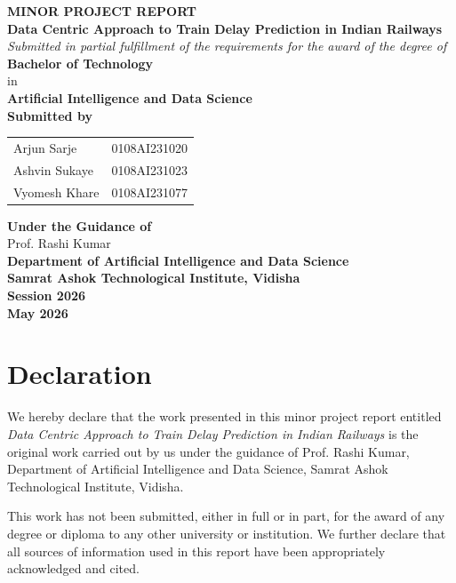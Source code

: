 \documentclass[12pt,a4paper]{report}
\newcommand{\projecttitle}{Data Centric Approach to Train Delay Prediction in Indian Railways}
\newcommand{\deptname}{Department of Artificial Intelligence and Data Science}
\newcommand{\institutename}{Samrat Ashok Technological Institute, Vidisha}
\newcommand{\sessionname}{Session 2026}
\newcommand{\submissionmonth}{May 2026}
\begin{document}
\begin{titlepage}
\centering
\vspace*{1.5cm}
{\Large \textbf{MINOR PROJECT REPORT}}\\[1.2cm]
{\LARGE \textbf{\projecttitle}}\\[1.5cm]

\textit{Submitted in partial fulfillment of the requirements for the award of the degree of}\\[0.3cm]
{\large \textbf{Bachelor of Technology}}\\[0.2cm]
{\large in}\\[0.2cm]
{\large \textbf{Artificial Intelligence and Data Science}}\\[1.2cm]

\textbf{Submitted by}\\[0.5cm]
\begin{tabular}{ll}
Arjun Sarje & 0108AI231020 \\
Ashvin Sukaye & 0108AI231023 \\
Vyomesh Khare & 0108AI231077 \\
\end{tabular}

\vfill
\textbf{Under the Guidance of}\\[0.2cm]
Prof. Rashi Kumar\\[1.0cm]

\textbf{\deptname}\\
\textbf{\institutename}\\
\textbf{\sessionname}\\
\textbf{\submissionmonth}
\end{titlepage}


\chapter*{Declaration}
We hereby declare that the work presented in this minor project report entitled \textit{\projecttitle} is the original work carried out by us under the guidance of Prof. Rashi Kumar, \deptname, \institutename.

This work has not been submitted, either in full or in part, for the award of any degree or diploma to any other university or institution. We further declare that all sources of information used in this report have been appropriately acknowledged and cited.
\end{document}
